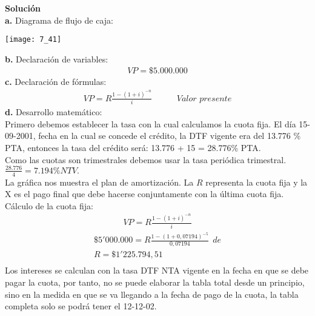 \textbf{Solución}\\
\textbf{a.}	Diagrama de flujo de caja:
\begin{center}
	\texttt{[image: 7\_41]}
\end{center}
\textbf{b.}	Declaración de variables:
\begin{align*}
	VP=\$ 5.000.000
\end{align*}
\textbf{c.}	Declaración de fórmulas:
\begin{align*}
	VP=R \frac{1-(1+i)^{-n}}{i}\hspace{35pt}\textit{Valor presente}
\end{align*}
\textbf{d.}	Desarrollo matemático:\\
Primero debemos establecer la tasa con la cual calculamos la cuota fija. El día 15-09-2001, fecha en la cual se concede el crédito, la DTF vigente era del 13.776 \% PTA, entonces la tasa del crédito será: 13.776 + 15 = 28.776\% PTA. \\

Como las cuotas son trimestrales debemos usar la tasa periódica trimestral. $\frac{28.776}{ 4} = 7.194\% NTV.$\\

La gráfica nos muestra el plan de amortización. La $R$ representa la cuota fija y la X es el pago final que debe hacerse conjuntamente con la última cuota fija. \\

Cálculo de la cuota fija:
\begin{align*}
	VP=R \frac{1-(1+i)^{-n}}{i}
\end{align*}
\begin{align*}
	\$ 5'000.000 = R \frac{1-(1+0,07194)^{-5}}{0,07194}\ \  de \\
	 R = \$ 1'225.794,51\\
	 
\end{align*}
Los intereses se calculan con la tasa DTF NTA vigente en la fecha en que se debe pagar la cuota, por tanto, no se puede elaborar la tabla total desde un principio, sino en la medida en que se va llegando a la fecha de pago de la cuota, la tabla completa solo se podrá tener el 12-12-02.\\

